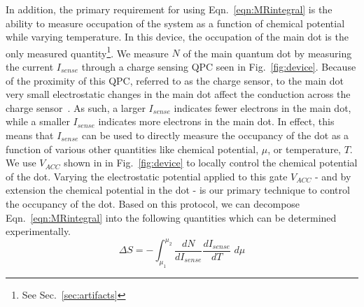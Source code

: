 In addition, the primary requirement for using Eqn.~\ref{eqn:MRintegral} is the ability to measure occupation of the system as a function of chemical potential while varying temperature. In this device, the occupation of the main dot is the only measured quantity\footnote{See Sec.~\ref{sec:artifacts}}. We measure $N$ of the main quantum dot by measuring the current $I_{sense}$ through a charge sensing \ac{QPC} seen in Fig.~\ref{fig:device}. Because of the proximity of this \ac{QPC}, referred to as the charge sensor, to the main dot very small electrostatic changes in the main dot affect the conduction across the charge sensor~\cite{spintocharge}. As such, a larger $I_{sense}$ indicates fewer electrons in the main dot, while a smaller $I_{sense}$ indicates more electrons in the main dot. In effect, this means that $I_{sense}$ can be used to directly measure the occupancy of the dot as a function of various other quantities like chemical potential, $\mu$, or temperature, $T$. We use $V_{ACC}$ shown in in Fig.~\ref{fig:device} to locally control the chemical potential of the dot. Varying the electrostatic potential applied to this gate $V_{ACC}$ - and by extension the chemical potential in the dot - is our primary technique to control the occupancy of the dot. Based on this protocol, we can decompose Eqn.~\ref{eqn:MRintegral} into the following quantities which can be determined experimentally.
\begin{equation}
	\label{eqn:eqn2}
	\Delta S = - \int_{\mu_1}^{\mu_2} \frac{dN}{dI_{sense}} \frac{dI_{sense}}{dT} \,\,  d \mu
\end{equation}

